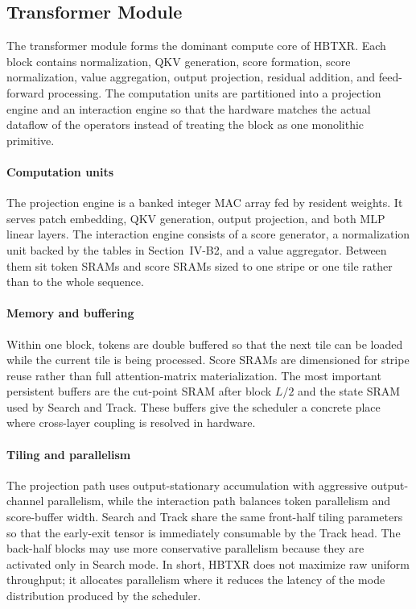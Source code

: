 \documentclass[journal]{IEEEtran}
\begin{document}
\subsection{Transformer Module}
The transformer module forms the dominant compute core of HBTXR. Each block contains normalization, QKV generation, score formation, score normalization, value aggregation, output projection, residual addition, and feed-forward processing. The computation units are partitioned into a projection engine and an interaction engine so that the hardware matches the actual dataflow of the operators instead of treating the block as one monolithic primitive.

\paragraph*{Computation units}
The projection engine is a banked integer MAC array fed by resident weights. It serves patch embedding, QKV generation, output projection, and both MLP linear layers. The interaction engine consists of a score generator, a normalization unit backed by the tables in Section~IV-B2, and a value aggregator. Between them sit token SRAMs and score SRAMs sized to one stripe or one tile rather than to the whole sequence.

\paragraph*{Memory and buffering}
Within one block, tokens are double buffered so that the next tile can be loaded while the current tile is being processed. Score SRAMs are dimensioned for stripe reuse rather than full attention-matrix materialization. The most important persistent buffers are the cut-point SRAM after block $L/2$ and the state SRAM used by Search and Track. These buffers give the scheduler a concrete place where cross-layer coupling is resolved in hardware.

\paragraph*{Tiling and parallelism}
The projection path uses output-stationary accumulation with aggressive output-channel parallelism, while the interaction path balances token parallelism and score-buffer width. Search and Track share the same front-half tiling parameters so that the early-exit tensor is immediately consumable by the Track head. The back-half blocks may use more conservative parallelism because they are activated only in Search mode. In short, HBTXR does not maximize raw uniform throughput; it allocates parallelism where it reduces the latency of the mode distribution produced by the scheduler.
\end{document}
